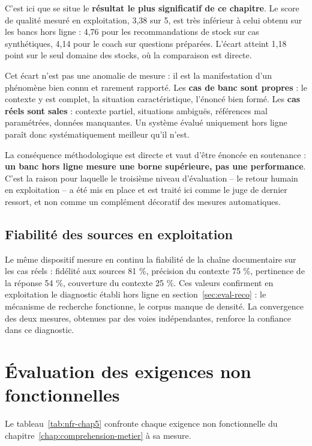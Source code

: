 C'est ici que se situe le \textbf{résultat le plus significatif de ce chapitre}. Le score de qualité mesuré en exploitation, 3,38 sur 5, est très inférieur à celui obtenu sur les bancs hors ligne : 4,76 pour les recommandations de stock sur cas synthétiques, 4,14 pour le coach sur questions préparées. L'écart atteint 1,18 point sur le seul domaine des stocks, où la comparaison est directe.

Cet écart n'est pas une anomalie de mesure : il est la manifestation d'un phénomène bien connu et rarement rapporté. Les \textbf{cas de banc sont propres} : le contexte y est complet, la situation caractéristique, l'énoncé bien formé. Les \textbf{cas réels sont sales} : contexte partiel, situations ambiguës, références mal paramétrées, données manquantes. Un système évalué uniquement hors ligne paraît donc systématiquement meilleur qu'il n'est.

La conséquence méthodologique est directe et vaut d'être énoncée en soutenance : \textbf{un banc hors ligne mesure une borne supérieure, pas une performance}. C'est la raison pour laquelle le troisième niveau d'évaluation -- le retour humain en exploitation -- a été mis en place et est traité ici comme le juge de dernier ressort, et non comme un complément décoratif des mesures automatiques.

\subsection{Fiabilité des sources en exploitation}

Le même dispositif mesure en continu la fiabilité de la chaîne documentaire sur les cas réels : fidélité aux sources 81 \%, précision du contexte 75 \%, pertinence de la réponse 54 \%, couverture du contexte 25 \%. Ces valeurs confirment en exploitation le diagnostic établi hors ligne en section~\ref{sec:eval-reco} : le mécanisme de recherche fonctionne, le corpus manque de densité. La convergence des deux mesures, obtenues par des voies indépendantes, renforce la confiance dans ce diagnostic.

\section{Évaluation des exigences non fonctionnelles}
\label{sec:eval-nfr}

Le tableau~\ref{tab:nfr-chap5} confronte chaque exigence non fonctionnelle du chapitre~\ref{chap:comprehension-metier} à sa mesure.

